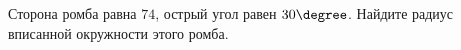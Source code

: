 \begin{ex}
	\begin{condition}
		Сторона ромба равна \( 74 \), острый угол равен \( 30 \degree \). Найдите радиус вписанной окружности этого ромба.
	\end{condition}
\end{ex}